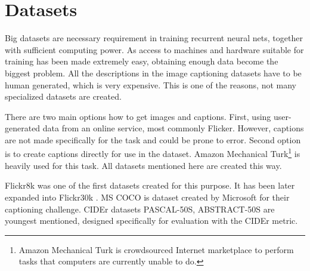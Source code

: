	\section{Datasets}
	\label{sec:datasets}		
Big datasets are necessary requirement in training recurrent neural nets, together with sufficient computing power. As access to machines and hardware suitable for training has been made extremely easy, obtaining enough data become the biggest problem. All the descriptions in the image captioning datasets have to be human generated, which is very expensive. This is one of the reasons, not many specialized datasets are created.

There are two main options how to get images and captions. First, using user-generated data from an online service, most commonly Flicker. However, captions are not made specifically for the task and could be prone to error. Second option is to create captions directly for use in the dataset. Amazon Mechanical Turk\footnote{Amazon Mechanical Turk is crowdsourced Internet marketplace to perform tasks that computers are currently unable to do.} is heavily used for this task. All datasets mentioned here are created this way.

Flickr8k \cite{dataset-flickr8k} was one of the first datasets created for this purpose. It has been later expanded into Flickr30k \cite{dataset-flickr30k}. MS COCO \cite{DBLP:journals/corr/ChenFLVGDZ15} is dataset created by Microsoft for their captioning challenge. CIDEr \cite{Vedantam_2015_CVPR} datasets PASCAL-50S, ABSTRACT-50S are youngest mentioned, designed specifically for evaluation with the CIDEr metric.

\def\arraystretch{1.2}%

